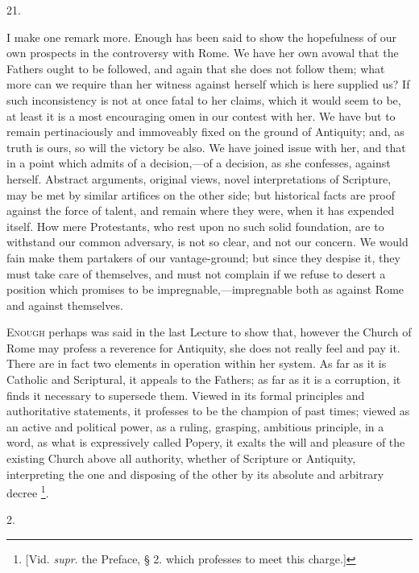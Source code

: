 21.

I make one remark more. Enough has been said to show the
hopefulness of our own prospects in the controversy with Rome. We
have her own avowal that the Fathers ought to be followed, and again
that she does not follow them; what more can we require than her
witness against herself which is here supplied us? If such
inconsistency is not at once fatal to her claims, which it would seem
to be, at least it is a most encouraging omen in our contest with her.
We have but to remain pertinaciously and immoveably fixed on the
ground of Antiquity; and, as truth is ours, so will the victory be
also. We have joined issue with her, and that in a point which admits
of a decision,—of a decision, as she confesses, against herself.
Abstract arguments, original views, novel interpretations of
Scripture, may be met by similar artifices on the other side; but
historical facts are proof against the force of talent, and remain
where they were, when it has expended itself. How mere Protestants,
who rest upon no such solid foundation, are to withstand our common
adversary, is not so clear, and not our concern. We would fain make
them partakers of our vantage-ground; but since they despise it, they
must take care of themselves, and must not complain if we refuse to
desert a position which promises to be impregnable,—impregnable both
as against Rome and against themselves.


E\textsc{nough} perhaps was said in the last Lecture to show that,
however the Church of Rome may profess a reverence for Antiquity, she
does not really feel and pay it. There are in fact two elements in
operation within her system. As far as it is Catholic and Scriptural,
it appeals to the Fathers; as far as it is a corruption, it finds it
necessary to supersede them. Viewed in its formal principles and
authoritative statements, it professes to be the champion of past
times; viewed as an active and political power, as a ruling, grasping,
ambitious principle, in a word, as what is expressively called Popery,
it exalts the will and pleasure of the existing Church above all
authority, whether of Scripture or Antiquity, interpreting the one and
disposing of the other by its absolute and arbitrary decree \footnote{[Vid. \emph{supr}. the Preface, § 2.
which professes to meet
this charge.]}.

2.

